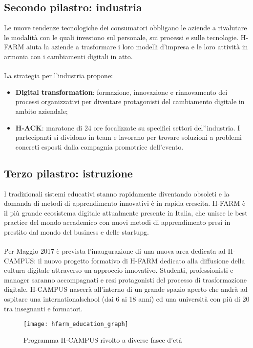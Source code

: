 \subsection{Secondo pilastro: industria}
Le nuove tendenze tecnologiche dei consumatori obbligano le aziende a rivalutare le modalità con le quali investono sul personale, sui processi e sulle tecnologie. H-FARM aiuta la aziende a trasformare i loro modelli d'impresa e le loro attività in armonia con i cambiamenti digitali in atto.
\\ \\
La strategia per l’industria propone:
\begin{itemize}
\item \textbf{Digital transformation}: formazione, innovazione e rinnovamento dei processi organizzativi per diventare protagonisti del cambiamento digitale in ambito aziendale;
\item \textbf{H-ACK}: maratone di 24 ore focalizzate su specifici settori del'’industria. I partecipanti si dividono in team e lavorano per trovare soluzioni a problemi concreti esposti dalla compagnia promotrice dell'evento.
\end{itemize}

\subsection{Terzo pilastro: istruzione}
I tradizionali sistemi educativi stanno rapidamente diventando obsoleti e la domanda di metodi di apprendimento innovativi è in rapida crescita. H-FARM è il più grande ecosistema digitale attualmente presente in Italia, che unisce le best practice del mondo accademico con nuovi metodi di apprendimento presi in prestito dal mondo del business e delle \gls{startupg}\glsfirstoccur.
\\ \\
Per Maggio 2017 è prevista l'inaugurazione di una nuova area dedicata ad H-CAMPUS: il nuovo progetto formativo di H-FARM dedicato alla diffusione della cultura digitale attraverso un approccio innovativo. 
Studenti, professionisti e manager saranno accompagnati e resi protagonisti del processo di trasformazione digitale.
H-CAMPUS nascerà all'interno di un grande spazio aperto che andrà ad ospitare una \gls{internationalschool}\glsfirstoccur{} (dai 6 ai 18 anni) ed una università con più di 20 tra insegnanti e formatori.

\begin{figure}[htbp]
\begin{center}
\texttt{[image: hfarm\_education\_graph]}
\caption{Programma H-CAMPUS rivolto a diverse fasce d'età}
\end{center}
\end{figure}

